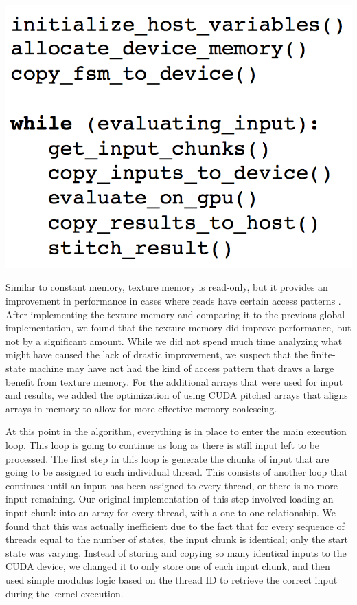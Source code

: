 \documentclass[11pt]{sigplanconf}
\newenvironment{Figure} %
  {\par\medskip\noindent\minipage{\linewidth}}
  {\endminipage\par\medskip}
\begin{document}
\begin{Figure}
\centering
\includegraphics[width=\linewidth]{algorithm.png}
\label{fig:Algorithm}
\end{Figure}

Similar to constant memory, texture memory is read-only, but it provides an improvement in performance in cases where reads have certain access patterns \cite{textures}. After implementing the texture memory and comparing it to the previous global implementation, we found that the texture memory did improve performance, but not by a significant amount. While we did not spend much time analyzing what might have caused the lack of drastic improvement, we suspect that the finite-state machine may have not had the kind of access pattern that draws a large benefit from texture memory. For the additional arrays that were used for input and results, we added the optimization of using CUDA pitched arrays that aligns arrays in memory to allow for more effective memory coalescing.

At this point in the algorithm, everything is in place to enter the main execution loop. This loop is going to continue as long as there is still input left to be processed. The first step in this loop is generate the chunks of input that are going to be assigned to each individual thread. This consists of another loop that continues until an input has been assigned to every thread, or there is no more input remaining. Our original implementation of this step involved loading an input chunk into an array for every thread, with a one-to-one relationship. We found that this was actually inefficient due to the fact that for every sequence of threads equal to the number of states, the input chunk is identical; only the start state was varying. Instead of storing and copying so many identical inputs to the CUDA device, we changed it to only store one of each input chunk, and then used simple modulus logic based on the thread ID to retrieve the correct input during the kernel execution.
\end{document}
